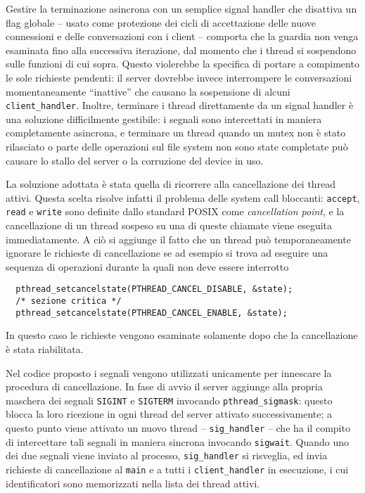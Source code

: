 \documentclass[11pt,oneside,a4paper]{article}
\begin{document}
Gestire la terminazione asincrona con un semplice signal handler che disattiva un flag globale -- usato come protezione dei cicli di accettazione delle nuove connessioni e delle conversazioni con i client -- comporta che la guardia non venga esaminata fino alla successiva iterazione, dal momento che i thread si sospendono sulle funzioni di cui sopra. Questo violerebbe la specifica di portare a compimento le sole richieste pendenti: il server dovrebbe invece interrompere le conversazioni momentaneamente ``inattive'' che causano la sospensione di alcuni \texttt{client\_handler}. Inoltre, terminare i thread direttamente da un signal handler è una soluzione difficilmente gestibile: i segnali sono intercettati in maniera completamente asincrona, e terminare un thread quando un mutex non è stato rilasciato o parte delle operazioni sul file system non sono state completate può causare lo stallo del server o la corruzione del device in uso.

La soluzione adottata è stata quella di ricorrere alla cancellazione dei thread attivi. Questa scelta risolve infatti il problema delle system call bloccanti: \texttt{accept}, \texttt{read} e \texttt{write} sono definite dallo standard POSIX come \emph{cancellation point}, e la cancellazione di un thread sospeso su una di queste chiamate viene eseguita immediatamente. A ciò si aggiunge il fatto che un thread può temporaneamente ignorare le richieste di cancellazione se ad esempio si trova ad eseguire una sequenza di operazioni durante la quali non deve essere interrotto
\begin{verbatim}
  pthread_setcancelstate(PTHREAD_CANCEL_DISABLE, &state);
  /* sezione critica */
  pthread_setcancelstate(PTHREAD_CANCEL_ENABLE, &state);
\end{verbatim}
In questo caso le richieste vengono esaminate solamente dopo che la cancellazione è stata riabilitata.

Nel codice proposto i segnali vengono utilizzati unicamente per innescare la procedura di cancellazione. In fase di avvio il server aggiunge alla propria maschera dei segnali \texttt{SIGINT} e \texttt{SIGTERM} invocando \texttt{pthread\_sigmask}: questo blocca la loro ricezione in ogni thread del server attivato successivamente; a questo punto viene attivato un nuovo thread -- \texttt{sig\_handler} -- che ha il compito di intercettare tali segnali in maniera sincrona invocando \texttt{sigwait}. Quando uno dei due segnali viene inviato al processo, \texttt{sig\_handler} si risveglia, ed invia richieste di cancellazione al \texttt{main} e a tutti i \texttt{client\_handler} in esecuzione, i cui identificatori sono memorizzati nella lista dei thread attivi.
\end{document}

